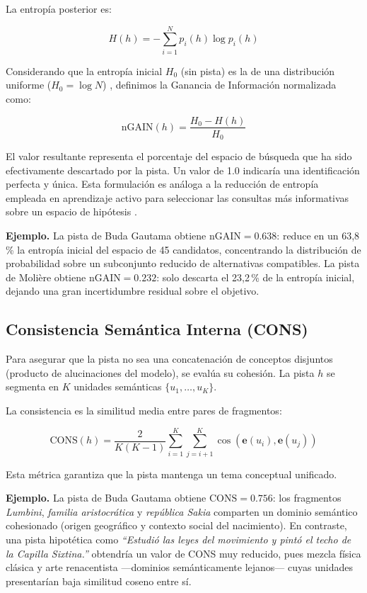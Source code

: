 \documentclass[../main.tex]{subfiles}
\begin{document}
La entropía posterior es:

\begin{equation}
H(h) = - \sum_{i=1}^{N} p_i(h)\log p_i(h)
\end{equation}

Considerando que la entropía inicial $H_0$ (sin pista) es la de una distribución uniforme ($H_0 = \log N$) \cite{Cover2006Elements, Shannon1948}, definimos la Ganancia de Información normalizada como:

\begin{equation}
\text{nGAIN}(h) =
\frac{H_0 - H(h)}{H_0}
\end{equation}

El valor resultante representa el porcentaje del espacio de búsqueda que ha sido efectivamente descartado por la pista. Un valor de 1.0 indicaría una identificación perfecta y única. Esta formulación es análoga a la reducción de entropía empleada en aprendizaje activo para seleccionar las consultas más informativas sobre un espacio de hipótesis \cite{Settles2009ActiveLearning}.

\medskip
\textbf{Ejemplo.} La pista de Buda Gautama obtiene $\text{nGAIN} = 0.638$: reduce en un 63,8\,\% la entropía inicial del espacio de 45 candidatos, concentrando la distribución de probabilidad sobre un subconjunto reducido de alternativas compatibles. La pista de Molière obtiene $\text{nGAIN} = 0.232$: solo descarta el 23,2\,\% de la entropía inicial, dejando una gran incertidumbre residual sobre el objetivo.

\subsection{Consistencia Semántica Interna (CONS)}

Para asegurar que la pista no sea una concatenación de conceptos disjuntos (producto de alucinaciones del modelo), se evalúa su cohesión. La pista $h$ se segmenta en $K$ unidades semánticas $\{u_1, \dots, u_K\}$.

La consistencia es la similitud media entre pares de fragmentos:

\begin{equation}
    \text{CONS}(h) = \frac{2}{K(K-1)} \sum_{i=1}^{K} \sum_{j=i+1}^{K} \cos(\mathbf{e}(u_i), \mathbf{e}(u_j))
\end{equation}

Esta métrica garantiza que la pista mantenga un tema conceptual unificado.

\medskip
\textbf{Ejemplo.} La pista de Buda Gautama obtiene $\text{CONS} = 0.756$: los fragmentos \textit{Lumbini}, \textit{familia aristocrática} y \textit{república Sakia} comparten un dominio semántico cohesionado (origen geográfico y contexto social del nacimiento). En contraste, una pista hipotética como \textit{``Estudió las leyes del movimiento y pintó el techo de la Capilla Sixtina.''} obtendría un valor de CONS muy reducido, pues mezcla física clásica y arte renacentista —dominios semánticamente lejanos— cuyas unidades presentarían baja similitud coseno entre sí.
\end{document}
